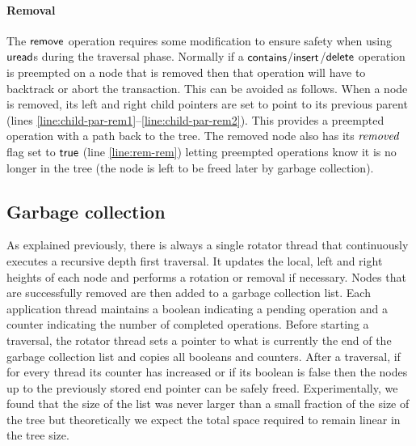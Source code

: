 \paragraph{Removal}
The $\act{remove}$ operation requires some modification to ensure safety when using $\act{uread}$s during the traversal phase.
Normally if a $\act{contains}$/$\act{insert}$/$\act{delete}$ operation is preempted on a node that is removed then that operation will have to backtrack or abort the transaction.
This can be avoided as follows.
When a node is removed, its left and right child pointers are set to point to its previous parent (lines \ref{line:child-par-rem1}--\ref{line:child-par-rem2}).
This provides a preempted operation with a path back to the tree.
The removed node also has its $\ms{removed}$ flag set to $\lit{true}$ (line \ref{line:rem-rem}) 
letting preempted operations know it is no longer in the tree (the node is left to be freed later by garbage collection).

\subsection{Garbage collection}\label{ssec:gc}

As explained previously, there is always a single rotator thread that continuously executes a recursive depth 
first traversal. 
It updates the local, left and right heights of each node and performs a rotation
or removal
if necessary. Nodes that are successfully removed are then added to a
garbage collection list.
Each 
application thread maintains a boolean indicating a pending operation and a counter indicating the number of 
completed operations. Before starting a traversal, the rotator thread sets a pointer to what is currently the end of 
the garbage collection list and copies all booleans and counters. After a traversal, if for every thread its counter 
has increased or if its boolean is false then the nodes up to the previously stored end pointer can be safely 
freed. Experimentally, we found that the size of the list was never larger than a small fraction of the size of the 
tree but theoretically we expect the total space required to remain linear in the tree size.



